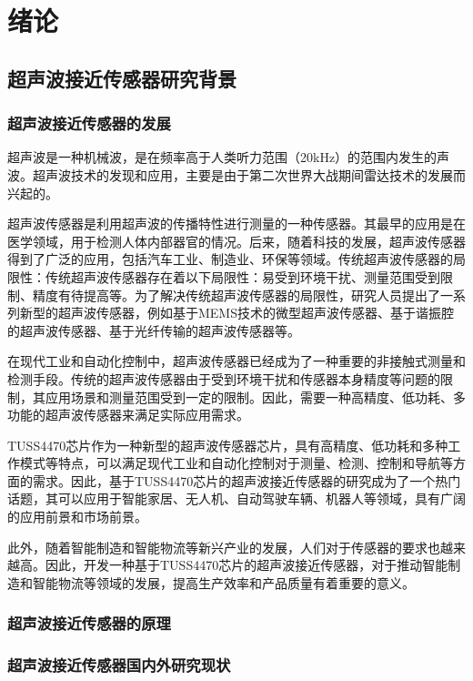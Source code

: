 	\newpage
	\section{绪论}
    \subsection{超声波接近传感器研究背景}
    \subsubsection{超声波接近传感器的发展}

超声波是一种机械波，是在频率高于人类听力范围（20kHz）的范围内发生的声波。超声波技术的发现和应用，主要是由于第二次世界大战期间雷达技术的发展而兴起的。\par
超声波传感器是利用超声波的传播特性进行测量的一种传感器。其最早的应用是在医学领域，用于检测人体内部器官的情况。后来，随着科技的发展，超声波传感器得到了广泛的应用，包括汽车工业、制造业、环保等领域。传统超声波传感器的局限性：传统超声波传感器存在着以下局限性：易受到环境干扰、测量范围受到限制、精度有待提高等。为了解决传统超声波传感器的局限性，研究人员提出了一系列新型的超声波传感器，例如基于MEMS技术的微型超声波传感器、基于谐振腔的超声波传感器、基于光纤传输的超声波传感器等。

在现代工业和自动化控制中，超声波传感器已经成为了一种重要的非接触式测量和检测手段。传统的超声波传感器由于受到环境干扰和传感器本身精度等问题的限制，其应用场景和测量范围受到一定的限制。因此，需要一种高精度、低功耗、多功能的超声波传感器来满足实际应用需求。\par
TUSS4470芯片作为一种新型的超声波传感器芯片，具有高精度、低功耗和多种工作模式等特点，可以满足现代工业和自动化控制对于测量、检测、控制和导航等方面的需求。因此，基于TUSS4470芯片的超声波接近传感器的研究成为了一个热门话题，其可以应用于智能家居、无人机、自动驾驶车辆、机器人等领域，具有广阔的应用前景和市场前景。\par
此外，随着智能制造和智能物流等新兴产业的发展，人们对于传感器的要求也越来越高。因此，开发一种基于TUSS4470芯片的超声波接近传感器，对于推动智能制造和智能物流等领域的发展，提高生产效率和产品质量有着重要的意义。
	\subsubsection{超声波接近传感器的原理}
    \subsubsection{超声波接近传感器国内外研究现状}
